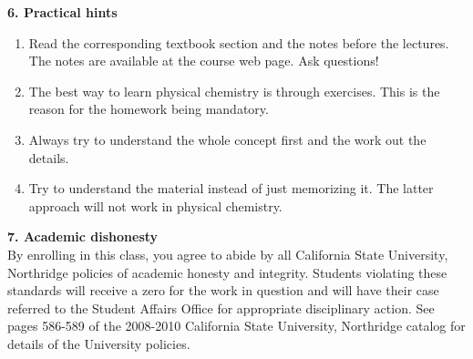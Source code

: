 \documentclass{report}
\begin{document}
\vspace{0.5cm}

\textbf{6. Practical hints}

\begin{enumerate}
\item Read the corresponding textbook section and the notes before the lectures. The notes are available at
the course web page. Ask questions!
\item The best way to learn physical chemistry is through exercises. This is the reason for the homework 
being mandatory.
\item Always try to understand the whole concept first and the work out the details.
\item Try to understand the material instead of just memorizing it. The latter approach will not work in 
physical chemistry.
\end{enumerate}

\vspace*{0.2cm}

\textbf{7. Academic dishonesty}\\

By enrolling in this class, you agree to abide by all California State University, Northridge policies of academic honesty and integrity. Students violating these standards will receive a zero for the work in question and will have their case referred to the Student Affairs Office for appropriate disciplinary action. See pages 586-589 of the 2008-2010 California State University, Northridge catalog for details of the University policies.
\end{document}
